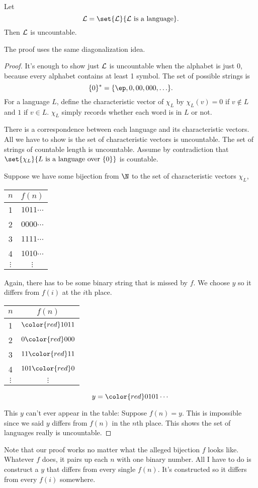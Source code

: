 \begin{thm}
Let 
\[
\cal L=\set{L}{L\text{ is a language}}.
\]
Then $\cal L$ is uncountable.
\end{thm}
The proof uses the same diagonalization idea.
\begin{proof}
It's enough to show just $\cal L$ is uncountable when the alphabet is just 0, because every alphabet contains at least 1 symbol. %
The set of possible strings is
\[
\{0\}^*=\{\ep,0,00,000,\ldots\}.
\]
For a language $L$, define the characteristic vector of $\chi_L$ by $\chi_L(v)=0$ if $v\nin L$ and $1$ if $v\in L$. $\chi_L$ simply records whether each word is in $L$ or not.

There is a correspondence between each language and its characteristic vectors. All we have to show is the set of characteristic vectors is uncountable. The set of strings of countable length is uncountable. Assume by contradiction that $\set{\chi_L}{L\text{ is a language over }\{0\}}$ is countable.

Suppose we have some bijection from $\N$ to the set of characteristic vectors $\chi_L$,

\begin{center}
\begin{tabular}{c|c}
$n$ & $f(n)$\tabularnewline
\hline 
1 & $1011\cdots$\tabularnewline
2 & $0000\cdots$ \tabularnewline
3 & $1111\cdots$ \tabularnewline
4 & $1010\cdots$ \tabularnewline
$\vdots$ & $\vdots$\tabularnewline
\end{tabular}\end{center}

Again, there has to be some binary string that is missed by $f$. We choose $y$ so it differs from $f(i)$ at the $i$th place.
\begin{center}
\begin{tabular}{c|c}
$n$ & $f(n)$\tabularnewline
\hline 
1 & ${\color{red}1}011$\tabularnewline
2 & $0{\color{red}0}00$\tabularnewline
3 & $11{\color{red}1}1$\tabularnewline
4 & $101{\color{red}0}$\tabularnewline
$\vdots$ & $\vdots$\tabularnewline
\end{tabular}
\end{center}
\[
y={\color{red}0101}\cdots
\]

This $y$ can't ever appear in the table: Suppose $f(n)=y$. This is impossible since we said $y$ differs from $f(n)$ in the $n$th place. This shows the set of languages really is uncountable.
\end{proof}
Note that our proof works no matter what the alleged bijection $f$ looks like. Whatever $f$ does, it pairs up each $n$ with one binary number. All I have to do is construct a $y$ that differs from every single $f(n)$. %
It's constructed so it differs from every $f(i)$ somewhere.


